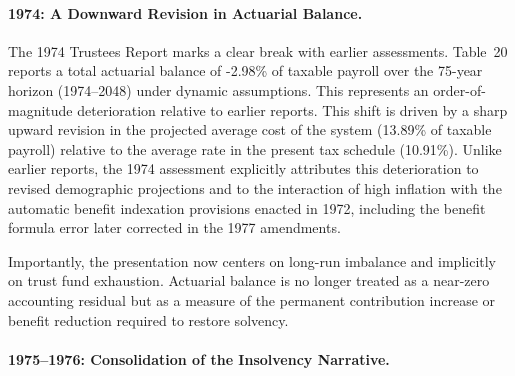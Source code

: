 \documentclass[12pt]{article}%
\theoremstyle{remark}
\begin{document}
\paragraph{1974: A Downward Revision in Actuarial Balance.}
The 1974 Trustees Report marks a clear break with earlier assessments. Table~20 reports a total actuarial balance of -2.98\% of taxable payroll over the 75-year horizon (1974--2048) under dynamic assumptions. This represents an order-of-magnitude deterioration relative to earlier reports. This shift is driven by a sharp upward revision in the projected average cost of the system (13.89\% of taxable payroll) relative to the average rate in the present tax schedule (10.91\%). Unlike earlier reports, the 1974 assessment explicitly attributes this deterioration to revised demographic projections and to the interaction of high inflation with the automatic benefit indexation provisions enacted in 1972, including the benefit formula error later corrected in the 1977 amendments.

Importantly, the presentation now centers on long-run imbalance and implicitly on trust fund exhaustion. Actuarial balance is no longer treated as a near-zero accounting residual but as a measure of the permanent contribution increase or benefit reduction required to restore solvency.

\paragraph{1975–1976: Consolidation of the Insolvency Narrative.}
\end{document}
